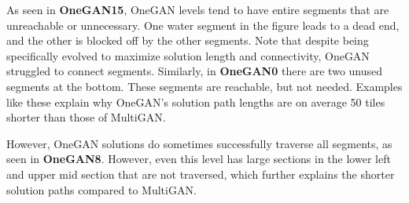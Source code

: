 

As seen in \textbf{OneGAN15}, OneGAN levels tend to have entire segments that are unreachable or unnecessary. One water segment in the figure 
leads to a dead end, and the other is blocked off by the other segments. Note that despite being specifically evolved to maximize
solution length and connectivity, OneGAN struggled to connect segments. Similarly, in \textbf{OneGAN0} there are two unused segments at the bottom.
These segments are reachable, but not needed. Examples like these explain why OneGAN's solution path lengths are on average 50 tiles shorter than those of MultiGAN.


However, OneGAN solutions do sometimes successfully traverse all segments, as seen in \textbf{OneGAN8}. However, even this level has large sections in the lower left and upper mid section that are not traversed, which further explains the shorter solution paths compared to MultiGAN.



